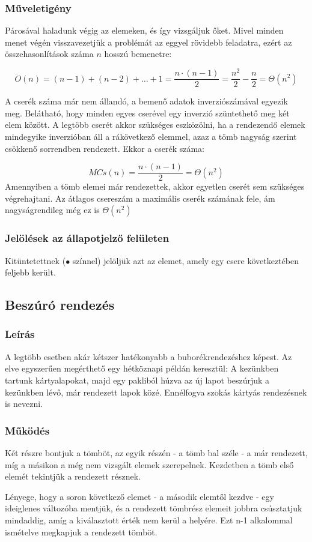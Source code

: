 \documentclass{elteikthesis}
\begin{document}
 \subsubsection{Műveletigény}
Párosával haladunk végig az elemeken, és így vizsgáljuk őket. Mivel minden menet végén visszavezetjük a problémát az eggyel rövidebb feladatra, ezért az összehasonlítások száma $n$ hosszú bemenetre:\par
$$\ddot{O}(n)=(n-1)+(n-2)+\ldots+1=\frac{n\cdot(n-1)}{2}=\frac{n^2}{2}-\frac{n}{2}=\Theta(n^2)$$
\par A cserék száma már nem állandó, a bemenő adatok inverziószámával egyezik meg. Belátható, hogy minden egyes cserével egy inverzió szüntethető meg két elem között. A legtöbb cserét akkor szükséges eszközölni, ha a rendezendő elemek mindegyike inverzióban áll a rákövetkező elemmel, azaz a tömb nagyság szerint csökkenő sorrendben rendezett. Ekkor a cserék száma:\par
$$MCs(n)=\frac{n\cdot(n-1)}{2}=\Theta(n^2)$$
Amennyiben a tömb elemei már rendezettek, akkor egyetlen cserét sem szükséges végrehajtani.
Az átlagos csereszám a maximális cserék számának fele\cite{Fekete}, ám nagyságrendileg még ez is $\Theta(n^2)$
\subsubsection{Jelölések az állapotjelző felületen}
Kitüntetettnek (\textcolor{select}{\Huge$\bullet$} színnel) jelöljük azt az elemet, amely egy csere következtében feljebb került.

\subsection{Beszúró rendezés}
\subsubsection{Leírás}
 A legtöbb esetben akár kétszer hatékonyabb a buborékrendezéshez képest\cite{Fekete}. Az elve egyszerűen megérthető egy hétköznapi példán keresztül: A kezünkben tartunk kártyalapokat, majd egy pakliból húzva az új lapot beszúrjuk a kezünkben lévő, már rendezett lapok közé. Ennélfogva szokás kártyás rendezésnek is nevezni.
\subsubsection{Működés}
Két részre bontjuk a tömböt, az egyik részén - a tömb bal széle - a már rendezett, míg a másikon a még nem vizsgált elemek szerepelnek. Kezdetben a tömb első elemét tekintjük a rendezett résznek.\par
Lényege, hogy a soron következő elemet - a második elemtől kezdve - egy ideiglenes változóba mentjük, és a rendezett tömbrész elemeit jobbra csúsztatjuk mindaddig, amíg a kiválasztott érték nem kerül a helyére. Ezt n-1 alkalommal ismételve megkapjuk a rendezett tömböt.
\end{document}
